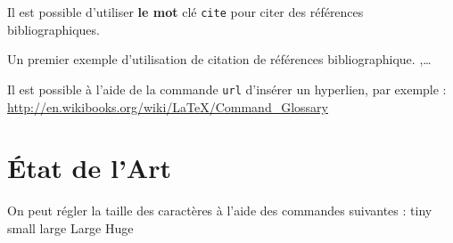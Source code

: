 \documentclass[twocolumn,a4paper]{IEEEtranfr}
\begin{document}
\begin{comment}
Désolé mais je ne suis pas d'accord, il faut tout virer. J'ai dit tout !
\end{comment}

Il est possible d'utiliser {\color{red}\textbf{le mot}} clé {\tt cite} pour citer des références
bibliographiques.  

Un premier exemple d'utilisation de citation de références bibliographique. 
\cite{akgu07},\cite{akgu091}\cite{zwic00}\cite{loredo_accuracy_2001}\ldots

Il est possible à l'aide de la commande {\tt url{}} d'insérer un
hyperlien, par exemple : \url{http://en.wikibooks.org/wiki/LaTeX/Command_Glossary}

\section{État de l'Art} 
On peut régler la taille des caractères à l'aide des commandes suivantes : 
{\tiny tiny \small small \large large \Large Large \huge Huge}
\par
\end{document}
